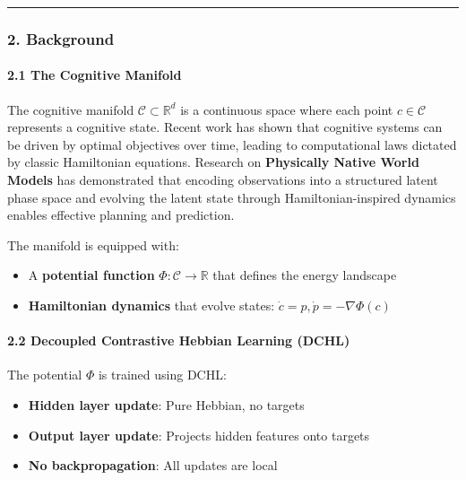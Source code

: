 \documentclass[
  11pt,
  a4paper,
]{article}
\providecommand{\tightlist}{%
  \setlength{\itemsep}{0pt}\setlength{\parskip}{0pt}}
\begin{document}
\begin{center}\rule{0.5\linewidth}{0.5pt}\end{center}

\subsubsection{2. Background}\label{background-1}

\paragraph{2.1 The Cognitive Manifold}\label{the-cognitive-manifold-1}

The cognitive manifold \(\mathcal{C} \subset \mathbb{R}^d\) is a
continuous space where each point \(c \in \mathcal{C}\) represents a
cognitive state. Recent work has shown that cognitive systems can be
driven by optimal objectives over time, leading to computational laws
dictated by classic Hamiltonian equations. Research on
\textbf{Physically Native World Models} has demonstrated that encoding
observations into a structured latent phase space and evolving the
latent state through Hamiltonian-inspired dynamics enables effective
planning and prediction.

The manifold is equipped with:

\begin{itemize}
\tightlist
\item
  A \textbf{potential function} \(\Phi: \mathcal{C} \to \mathbb{R}\)
  that defines the energy landscape
\item
  \textbf{Hamiltonian dynamics} that evolve states:
  \(\dot{c} = p, \dot{p} = -\nabla\Phi(c)\)
\end{itemize}

\paragraph{2.2 Decoupled Contrastive Hebbian Learning
(DCHL)}\label{decoupled-contrastive-hebbian-learning-dchl}

The potential \(\Phi\) is trained using DCHL:

\begin{itemize}
\tightlist
\item
  \textbf{Hidden layer update}: Pure Hebbian, no targets
\item
  \textbf{Output layer update}: Projects hidden features onto targets
\item
  \textbf{No backpropagation}: All updates are local
\end{itemize}
\end{document}
